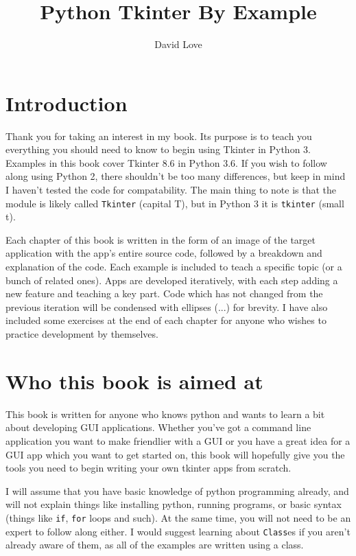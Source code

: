 \documentclass[a4paper,11pt,openany]{book}
\title{Python Tkinter By Example}
\author{David Love}
\begin{document}
\maketitle
\tableofcontents
\newpage

\section{Introduction}
Thank you for taking an interest in my book. Its purpose is to teach you everything you should need to know to begin using Tkinter in Python 3. Examples in this book cover Tkinter 8.6 in Python 3.6. If you wish to follow along using Python 2, there shouldn't be too many differences, but keep in mind I haven't tested the code for compatability. The main thing to note is that the module is likely called \lstinline[columns=fixed]{Tkinter} (capital T), but in Python 3 it is \lstinline[columns=fixed]{tkinter} (small t). 

\vspace{5mm}

Each chapter of this book is written in the form of an image of the target application with the app's entire source code, followed by a breakdown and explanation of the code. Each example is included to teach a specific topic (or a bunch of related ones). Apps are developed iteratively, with each step adding a new feature and teaching a key part. Code which has not changed from the previous iteration will be condensed with ellipses (...) for brevity. I have also included some exercises at the end of each chapter for anyone who wishes to practice development by themselves.

\section{Who this book is aimed at}

This book is written for anyone who knows python and wants to learn a bit about developing GUI applications. Whether you've got a command line application you want to make friendlier with a GUI or you have a great idea for a GUI app which you want to get started on, this book will hopefully give you the tools you need to begin writing your own tkinter apps from scratch.

I will assume that you have basic knowledge of python programming already, and will not explain things like installing python, running programs, or basic syntax (things like \lstinline[columns=fixed]{if}, \lstinline[columns=fixed]{for} loops and such). At the same time, you will not need to be an expert to follow along either. I would suggest learning about \lstinline[columns=fixed]{Class}es if you aren't already aware of them, as all of the examples are written using a class.
\end{document}
